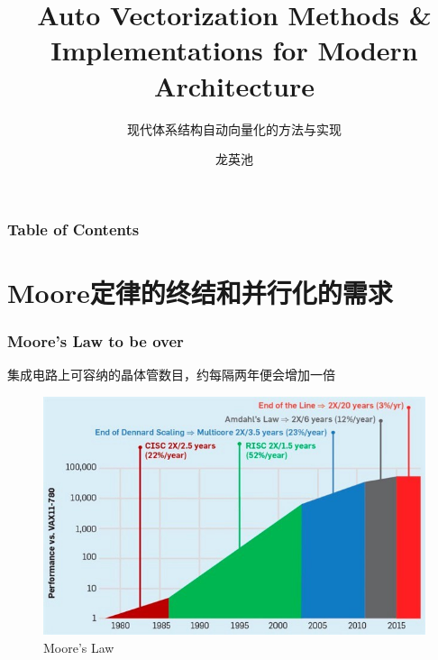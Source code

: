 \documentclass[aspectratio=169]{ctexbeamer}
\title{Auto Vectorization Methods \& Implementations for Modern Architecture}
\subtitle{现代体系结构自动向量化的方法与实现}
\author{龙英池}
\institute{HIT}
\begin{document}
\maketitle

\begin{frame}
    \frametitle{Table of Contents}

    \tableofcontents

\end{frame}

\section{Moore定律的终结和并行化的需求}

\begin{frame}
    \frametitle{Moore's Law to be over}

    集成电路上可容纳的晶体管数目，约每隔两年便会增加一倍

    \begin{figure}[h]
        \includegraphics[height=0.5\textheight]{images/moore.jpeg}
        \caption{Moore's Law}
    \end{figure}

\end{frame}
\end{document}
